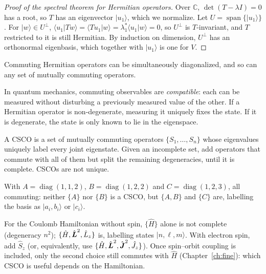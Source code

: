 \begin{proof}[Proof of the spectral theorem for Hermitian operators]
Over $\mathbb{C}$, $\det(T-\lambda I) = 0$ has a root, so $T$ has an eigenvector $|u_1\rangle$, which we normalize. Let $U = \operatorname{span}\{|u_1\rangle\}$. For $|w\rangle\in U^\perp$, $\langle u_1|Tw\rangle = \langle Tu_1|w\rangle = \lambda_1^*\langle u_1|w\rangle = 0$, so $U^\perp$ is $T$-invariant, and $T$ restricted to it is still Hermitian. By induction on dimension, $U^\perp$ has an orthonormal eigenbasis, which together with $|u_1\rangle$ is one for $V$.
\end{proof}

\begin{theorem}
Commuting Hermitian operators can be simultaneously diagonalized, and so can any set of mutually commuting operators.
\end{theorem}

In quantum mechanics, commuting observables are \emph{compatible}: each can be measured without disturbing a previously measured value of the other. If a Hermitian operator is non-degenerate, measuring it uniquely fixes the state. If it is degenerate, the state is only known to lie in the eigenspace.

\begin{definition}
A CSCO is a set of mutually commuting operators $\{S_1,\ldots,S_n\}$ whose eigenvalues uniquely label every joint eigenstate. Given an incomplete set, add operators that commute with all of them but split the remaining degeneracies, until it is complete. CSCOs are not unique.
\end{definition}

\begin{example}[A CSCO]
With $A = \operatorname{diag}(1,1,2)$, $B = \operatorname{diag}(1,2,2)$ and $C = \operatorname{diag}(1,2,3)$, all commuting: neither $\{A\}$ nor $\{B\}$ is a CSCO, but $\{A,B\}$ and $\{C\}$ are, labelling the basis as $|a_i,b_i\rangle$ or $|c_i\rangle$.
\end{example}

\begin{example}
For the Coulomb Hamiltonian without spin, $\{\hat{H}\}$ alone is not complete (degeneracy $n^2$); $\{\hat{H},\hat{\vect{L}}^2,\hat{L}_z\}$ is, labelling states $|n,\ell,m\rangle$. With electron spin, add $\hat{S}_z$ (or, equivalently, use $\{\hat{H},\hat{\vect{L}}^2,\hat{\vect{J}}^2,\hat{J}_z\}$). Once spin--orbit coupling is included, only the second choice still commutes with $\hat{H}$ (Chapter~\ref{ch:fine}): which CSCO is useful depends on the Hamiltonian.
\end{example}

